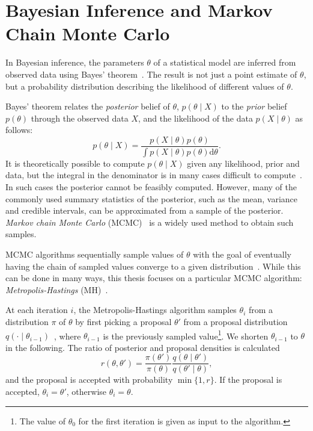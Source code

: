 \documentclass[english,twoside,openright]{HYgraduMLDS}
\newcommand{\dx}{\mathrm{d}}
\begin{document}
\section{Bayesian Inference and Markov Chain Monte Carlo}\label{MCMC_background}

In Bayesian inference, the parameters \(\theta\) of a statistical model are
inferred from 
observed data using Bayes' theorem~\cite{BDA}. The result is not just a point estimate 
of \(\theta\), but a probability distribution describing the likelihood
of different values of \(\theta\).

Bayes' theorem relates the \emph{posterior} belief of \(\theta\),
\(p(\theta \mid X)\) to the \emph{prior} belief \(p(\theta)\) through the 
observed data \(X\), and the likelihood of the data \(p(X\mid \theta)\) as follows:
\[
    p(\theta \mid X) = \frac{p(X \mid \theta)p(\theta)}
    {\int p(X\mid \theta)p(\theta)\dx\theta}.
\]
It is theoretically possible to compute \(p(\theta \mid X)\) given any 
likelihood, prior and data, but the integral in the denominator is in many 
cases difficult to compute~\cite{BDA}. In such cases the posterior cannot be feasibly 
computed. However, many of the commonly used summary statistics of the posterior, 
such as the mean, variance and credible intervals, can be approximated from 
a sample of the posterior. \emph{Markov chain Monte Carlo}
(MCMC)~\cite{MRR53} is a widely used method to obtain such samples.

MCMC algorithms sequentially sample values of \(\theta\)
with the goal of eventually having the chain of sampled values converge to 
a given distribution~\cite{BDA}. While this can be done in many ways, this thesis 
focuses on a particular MCMC algorithm:
\emph{Metropolis-Hastings} (MH)~\cite{MRR53, Has70}.

At each iteration \(i\), the Metropolis-Hastings algorithm samples \(\theta_i\) 
from a distribution \(\pi\) of \(\theta\)
by first picking a proposal \(\theta'\) from a proposal 
distribution \(q(\cdot \mid \theta_{i-1})\)~\cite{MRR53}, where \(\theta_{i-1}\) is the
previously sampled value\footnote{
    The value of \(\theta_0\) for the first iteration is given as input to the 
    algorithm.
}. We shorten \(\theta_{i-1}\) to \(\theta\) in the following. 
The ratio of posterior and proposal densities is calculated
\[
    r(\theta, \theta') = \frac{\pi(\theta')}{\pi(\theta)}
    \frac{q(\theta\mid \theta')}{q(\theta'\mid \theta)},
\]
and the proposal is accepted with probability \(\min\{1, r\}\). 
If the proposal is accepted, 
\(\theta_i = \theta'\), otherwise \(\theta_i = \theta\).
\end{document}

